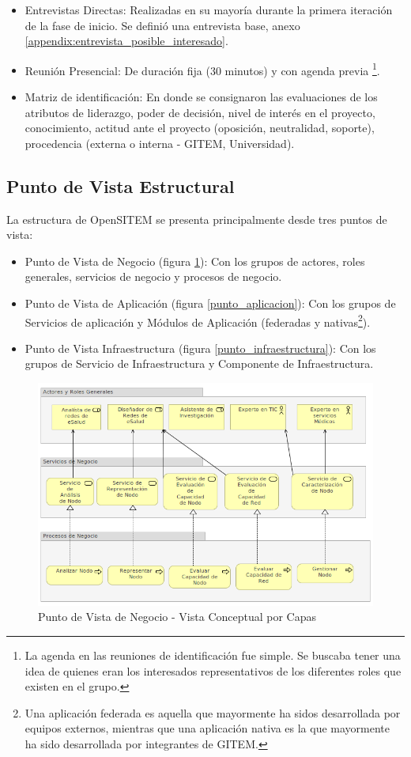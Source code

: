 \begin{itemize}
 \item Entrevistas Directas: Realizadas en su mayoría durante la primera iteración de la fase de inicio. Se definió una entrevista base, anexo \ref{appendix:entrevista_posible_interesado}.
 \item Reunión Presencial: De duración fija (30 minutos) y con agenda previa \footnote{La agenda en las reuniones de identificación fue simple. Se buscaba tener una idea de quienes eran los interesados representativos de los diferentes roles que existen en el grupo.}.
 \item Matriz de identificación: En donde se consignaron las evaluaciones de los atributos de liderazgo, poder de decisión, nivel de interés en el proyecto, conocimiento, actitud ante el proyecto (oposición, neutralidad, soporte), procedencia (externa o interna - GITEM, Universidad). 
\end{itemize}

\subsection{Punto de Vista Estructural}

La estructura de OpenSITEM se presenta principalmente desde tres puntos de vista:

\begin{itemize}
 \item Punto de Vista de Negocio (figura \ref{punto_negocio}): Con los grupos de actores, roles generales, servicios de negocio y procesos de negocio.
 \item Punto de Vista de Aplicación (figura \ref{punto_aplicacion}): Con los grupos de Servicios de aplicación y Módulos de Aplicación (federadas y nativas\footnote{Una aplicación federada es aquella que mayormente ha sidos desarrollada por equipos externos, mientras que una aplicación nativa es la que mayormente ha sido desarrollada por integrantes de GITEM.}).
 \item Punto de Vista Infraestructura (figura \ref{punto_infraestructura}): Con los grupos de Servicio de Infraestructura y Componente de Infraestructura.
\end{itemize}

\begin{figure}
 \centering
 \includegraphics[width=120mm]{negocio_vista_por_capas.png}
 \caption{Punto de Vista de Negocio - Vista Conceptual por Capas}
 \label{punto_negocio}
\end{figure}

